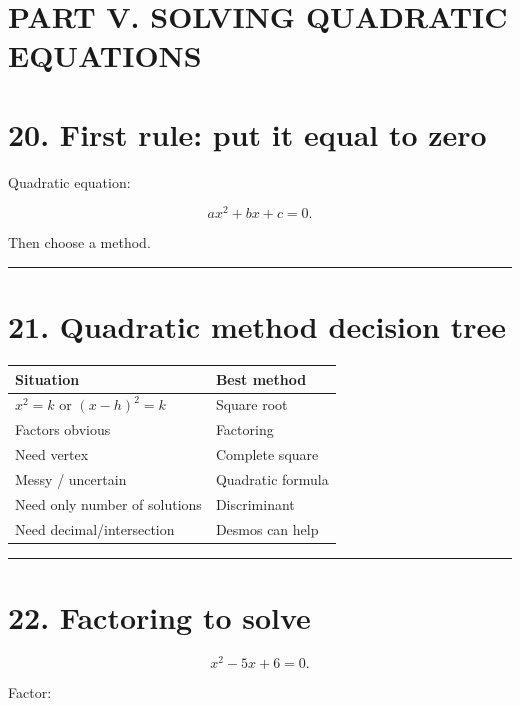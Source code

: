 \documentclass[
]{article}
\newcounter{none} %
\begin{document}
\section{PART V. SOLVING QUADRATIC
EQUATIONS}\label{part-v.-solving-quadratic-equations}

\section{20. First rule: put it equal to
zero}\label{first-rule-put-it-equal-to-zero}

Quadratic equation:

\[
ax^2+bx+c=0.
\]

Then choose a method.

\begin{center}\rule{0.5\linewidth}{0.5pt}\end{center}

\section{21. Quadratic method decision
tree}\label{quadratic-method-decision-tree}

{\def\LTcaptype{none} %
\begin{longtable}[]{@{}ll@{}}
\toprule\noalign{}
Situation & Best method \\
\midrule\noalign{}
\endhead
\bottomrule\noalign{}
\endlastfoot
\(x^2=k\) or \((x-h)^2=k\) & Square root \\
Factors obvious & Factoring \\
Need vertex & Complete square \\
Messy / uncertain & Quadratic formula \\
Need only number of solutions & Discriminant \\
Need decimal/intersection & Desmos can help \\
\end{longtable}
}

\begin{center}\rule{0.5\linewidth}{0.5pt}\end{center}

\section{22. Factoring to solve}\label{factoring-to-solve}

\[
x^2-5x+6=0.
\]

Factor:
\end{document}
